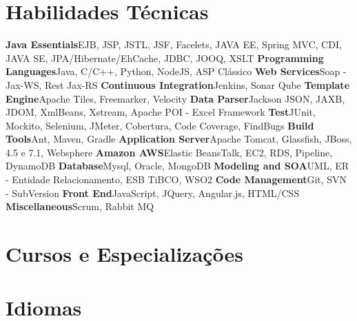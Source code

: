\documentclass[11pt,a4paper]{moderncv}
\begin{document}
\section{Habilidades Técnicas}
\cvcomputer
{\textbf{Java Essentials}}{EJB, JSP, JSTL, JSF, Facelets, JAVA EE, Spring MVC, CDI, JAVA SE, JPA/Hibernate/EhCache, JDBC, JOOQ, XSLT}
{\textbf{Programming Languages}}{Java, C/C++, Python, NodeJS, ASP Clássico}
\cvcomputer
{\textbf{Web Services}}{Soap - Jax-WS, Rest Jax-RS}
{\textbf{Continuous Integration}}{Jenkins, Sonar Qube}
\cvcomputer
{\textbf{Template Engine}}{Apache Tiles, Freemarker, Velocity}
{\textbf{Data Parser}}{Jackson JSON, JAXB, JDOM, XmlBeans, Xstream, Apache POI - Excel Framework}
\cvcomputer
{\textbf{Test}}{JUnit, Mockito, Selenium, JMeter, Cobertura, Code Coverage, FindBugs}
{\textbf{Build Tools}}{Ant, Maven, Gradle}
\cvcomputer
{\textbf{Application Server}}{Apache Tomcat, Glassfish, JBoss, 4.5 e 7.1, Websphere}
{\textbf{Amazon AWS}}{Elastic BeansTalk, EC2, RDS, Pipeline, DynamoDB}
\cvcomputer
{\textbf{Database}}{Mysql, Oracle, MongoDB}
{\textbf{Modeling and SOA}}{UML, ER - Entidade Relacionamento, ESB TiBCO, WSO2}
\cvcomputer
{\textbf{Code Management}}{Git, SVN - SubVersion}
{\textbf{Front End}}{JavaScript, JQuery, Angular.js, HTML/CSS}
\cvcomputer
{\textbf{Miscellaneous}}{Scrum, Rabbit MQ}
{}{}


\section{Cursos e Especializaç\~{o}es}


\section{Idiomas}

\end{document}
